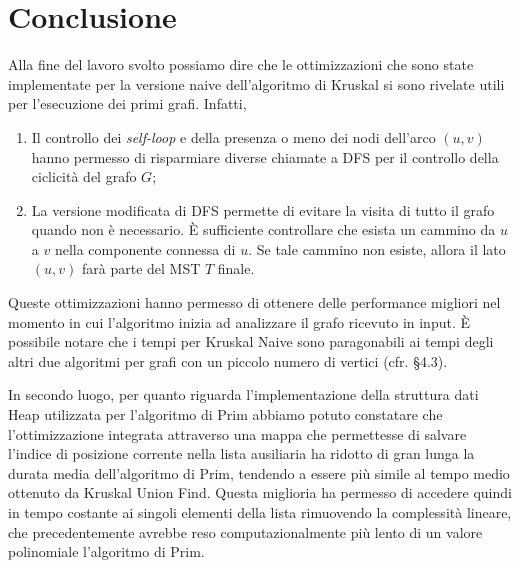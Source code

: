 \section{Conclusione}


Alla fine del lavoro svolto possiamo dire che le ottimizzazioni che sono state implementate per la versione naive dell'algoritmo di Kruskal si sono 
rivelate utili per l'esecuzione dei primi grafi. Infatti,
\begin{enumerate}
    \item Il controllo dei \textit{self-loop} e della presenza o meno dei nodi dell'arco $(u, v)$ hanno permesso di risparmiare diverse chiamate a DFS per il 
    controllo della ciclicità del grafo $G$;
    \item La versione modificata di DFS permette di evitare la visita di tutto il grafo quando non è necessario. È sufficiente controllare che esista un cammino 
    da $u$ a $v$ nella componente connessa di $u$. Se tale cammino non esiste, allora il lato $(u, v)$ farà parte del MST $T$ finale.
\end{enumerate}
Queste ottimizzazioni hanno permesso di ottenere delle performance migliori nel momento in cui l'algoritmo inizia ad analizzare il grafo ricevuto in 
input. È possibile notare che i tempi per Kruskal Naive sono paragonabili ai tempi degli altri due algoritmi per grafi con un piccolo numero di vertici (cfr. \S{4.3}).



In secondo luogo, per quanto riguarda l'implementazione della struttura dati Heap utilizzata per l'algoritmo di Prim abbiamo potuto constatare che l'ottimizzazione integrata attraverso una mappa che permettesse di salvare l'indice di posizione corrente nella lista ausiliaria ha ridotto di gran lunga la durata media dell'algoritmo di Prim, tendendo a essere più simile al tempo medio ottenuto da Kruskal Union Find. Questa miglioria ha permesso di accedere quindi in tempo costante ai singoli elementi della lista rimuovendo la complessità lineare, che precedentemente avrebbe reso computazionalmente più lento di un valore polinomiale l'algoritmo di Prim.



